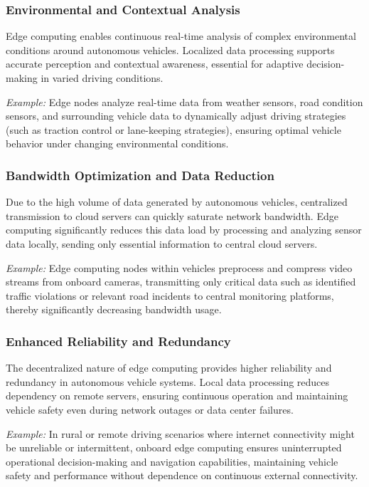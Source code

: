 \documentclass[runningheads]{llncs}
\begin{document}
\subsubsection{Environmental and Contextual Analysis}
Edge computing enables continuous real-time analysis of complex environmental conditions around autonomous vehicles. Localized data processing supports accurate perception and contextual awareness, essential for adaptive decision-making in varied driving conditions.

\textit{Example:} Edge nodes analyze real-time data from weather sensors, road condition sensors, and surrounding vehicle data to dynamically adjust driving strategies (such as traction control or lane-keeping strategies), ensuring optimal vehicle behavior under changing environmental conditions.

\subsubsection{Bandwidth Optimization and Data Reduction}
Due to the high volume of data generated by autonomous vehicles, centralized transmission to cloud servers can quickly saturate network bandwidth. Edge computing significantly reduces this data load by processing and analyzing sensor data locally, sending only essential information to central cloud servers.

\textit{Example:} Edge computing nodes within vehicles preprocess and compress video streams from onboard cameras, transmitting only critical data such as identified traffic violations or relevant road incidents to central monitoring platforms, thereby significantly decreasing bandwidth usage.

\subsubsection{Enhanced Reliability and Redundancy}
The decentralized nature of edge computing provides higher reliability and redundancy in autonomous vehicle systems. Local data processing reduces dependency on remote servers, ensuring continuous operation and maintaining vehicle safety even during network outages or data center failures.

\textit{Example:} In rural or remote driving scenarios where internet connectivity might be unreliable or intermittent, onboard edge computing ensures uninterrupted operational decision-making and navigation capabilities, maintaining vehicle safety and performance without dependence on continuous external connectivity.
\end{document}
